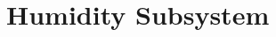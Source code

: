\documentclass[../main]{subfiles}
\begin{document}
\chapter{Humidity Subsystem} \label{chp:humeSubsystem}




\end{document}
